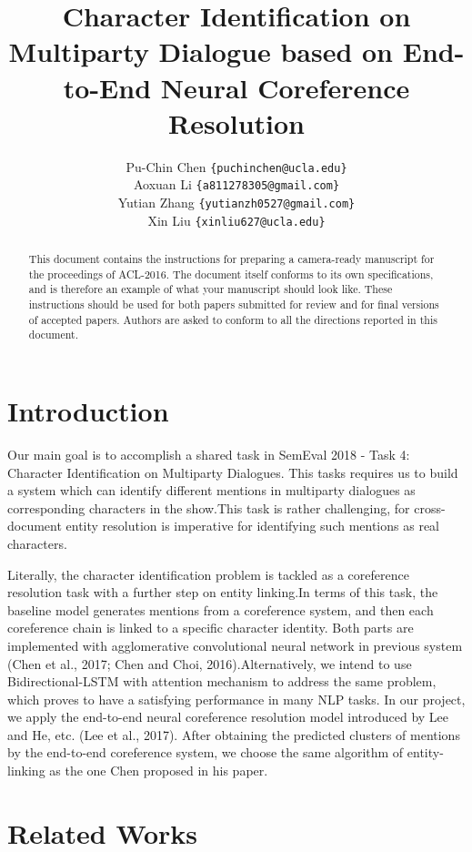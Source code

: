 \documentclass[11pt]{article}
\title{Character Identification on Multiparty Dialogue based on End-to-End Neural Coreference Resolution}
\author
{
   Pu-Chin Chen
  {\tt \{puchinchen@ucla.edu\}} \\
  Aoxuan Li 
  {\tt \{a811278305@gmail.com\}} \\
  Yutian Zhang
  {\tt \{yutianzh0527@gmail.com\}} \\
  Xin Liu
  {\tt \{xinliu627@ucla.edu\}} \\
}
\date{}
\begin{document}
\maketitle
\begin{abstract}
  This document contains the instructions for preparing a camera-ready
  manuscript for the proceedings of ACL-2016. The document itself
  conforms to its own specifications, and is therefore an example of
  what your manuscript should look like. These instructions should be
  used for both papers submitted for review and for final versions of
  accepted papers.  Authors are asked to conform to all the directions
  reported in this document.
\end{abstract}

\section{Introduction}

Our main goal is to accomplish a shared task in SemEval 2018 - Task 4: Character Identification on Multiparty Dialogues. This tasks requires us to build a system which can identify different mentions in multiparty dialogues as corresponding characters in the show.This task is rather challenging, for cross-document entity resolution is imperative for identifying such mentions as real characters.

Literally, the character identification problem is tackled as a coreference resolution task with a further step on entity linking.In terms of this task, the baseline model generates mentions from a coreference system, and then each coreference chain is linked to a specific character identity. Both parts are implemented with agglomerative convolutional neural network in previous system (Chen et al., 2017; Chen and Choi, 2016).Alternatively, we intend to use Bidirectional-LSTM with attention mechanism to address the same problem, which proves to have a satisfying performance in many NLP tasks. In our project, we apply the end-to-end neural coreference resolution model introduced by Lee and He, etc. (Lee et al., 2017). After obtaining the predicted clusters of mentions by the end-to-end coreference system, we choose the same algorithm of entity-linking as the one Chen proposed in his paper.

\section{Related Works}
\end{document}
